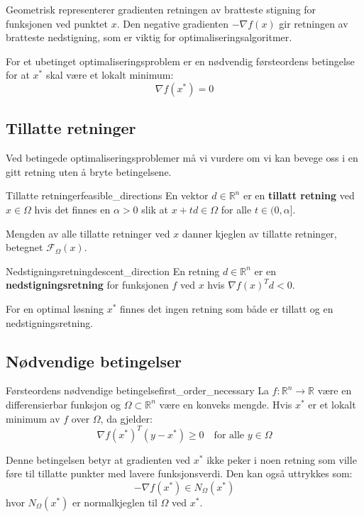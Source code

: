 Geometrisk representerer gradienten retningen av bratteste stigning for funksjonen ved punktet $x$. Den negative gradienten $-\nabla f(x)$ gir retningen av bratteste nedstigning, som er viktig for optimaliseringsalgoritmer.

For et ubetinget optimaliseringsproblem er en nødvendig førsteordens betingelse for at $x^*$ skal være et lokalt minimum:
\[
	\nabla f(x^*) = 0
\]

\subsection{Tillatte retninger}

Ved betingede optimaliseringsproblemer må vi vurdere om vi kan bevege oss i en gitt retning uten å bryte betingelsene.

\begin{definition}{Tillatte retninger}{feasible_directions}
	En vektor $d \in \mathbb{R}^n$ er en \textbf{tillatt retning} ved $x \in \Omega$ hvis det finnes en $\alpha > 0$ slik at $x + td \in \Omega$ for alle $t \in (0, \alpha]$.

	Mengden av alle tillatte retninger ved $x$ danner kjeglen av tillatte retninger, betegnet $\mathcal{F}_\Omega(x)$.
\end{definition}

\begin{definition}{Nedstigningsretning}{descent_direction}
	En retning $d \in \mathbb{R}^n$ er en \textbf{nedstigningsretning} for funksjonen $f$ ved $x$ hvis $\nabla f(x)^T d < 0$.
\end{definition}

For en optimal løsning $x^*$ finnes det ingen retning som både er tillatt og en nedstigningsretning.

\subsection{Nødvendige betingelser}

\begin{theorem}{Førsteordens nødvendige betingelse}{first_order_necessary}
	La $f: \mathbb{R}^n \to \mathbb{R}$ være en differensierbar funksjon og $\Omega \subset \mathbb{R}^n$ være en konveks mengde. Hvis $x^*$ er et lokalt minimum av $f$ over $\Omega$, da gjelder:
	\[
		\nabla f(x^*)^T (y - x^*) \geq 0 \quad \text{for alle } y \in \Omega
	\]
\end{theorem}

Denne betingelsen betyr at gradienten ved $x^*$ ikke peker i noen retning som ville føre til tillatte punkter med lavere funksjonsverdi. Den kan også uttrykkes som:
\[
	-\nabla f(x^*) \in N_\Omega(x^*)
\]
hvor $N_\Omega(x^*)$ er normalkjeglen til $\Omega$ ved $x^*$.

